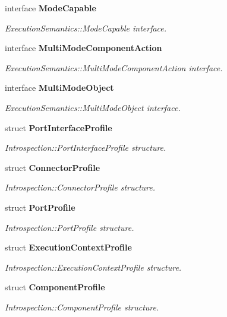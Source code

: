 \begin{CompactItemize}
interface {\bf Mode\-Capable}
\begin{CompactList}\small\item\em Execution\-Semantics::Mode\-Capable interface. \item\end{CompactList}\item 
interface {\bf Multi\-Mode\-Component\-Action}
\begin{CompactList}\small\item\em Execution\-Semantics::Multi\-Mode\-Component\-Action interface. \item\end{CompactList}\item 
interface {\bf Multi\-Mode\-Object}
\begin{CompactList}\small\item\em Execution\-Semantics::Multi\-Mode\-Object interface. \item\end{CompactList}\item 
struct {\bf Port\-Interface\-Profile}
\begin{CompactList}\small\item\em Introspection::Port\-Interface\-Profile structure. \item\end{CompactList}\item 
struct {\bf Connector\-Profile}
\begin{CompactList}\small\item\em Introspection::Connector\-Profile structure. \item\end{CompactList}\item 
struct {\bf Port\-Profile}
\begin{CompactList}\small\item\em Introspection::Port\-Profile structure. \item\end{CompactList}\item 
struct {\bf Execution\-Context\-Profile}
\begin{CompactList}\small\item\em Introspection::Execution\-Context\-Profile structure. \item\end{CompactList}\item 
struct {\bf Component\-Profile}
\begin{CompactList}\small\item\em Introspection::Component\-Profile structure. \item\end{CompactList}\item 

\end{CompactItemize}
